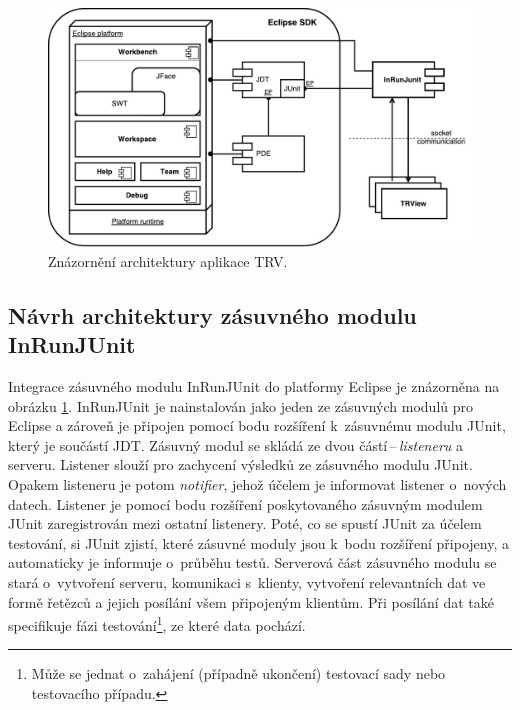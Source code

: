   \begin{figure}
    \includegraphics[width=\textwidth, center]{obrazky-figures/TRV_architecture.pdf}
    \caption{Znázornění architektury aplikace TRV.}
    \label{fig:TRV_architecture}
  \end{figure}

    \subsection{Návrh architektury zásuvného modulu InRunJUnit}
    Integrace zásuvného modulu InRunJUnit do platformy Eclipse je znázorněna na obrázku \ref{fig:TRV_architecture}. InRunJUnit je nainstalován jako jeden ze zásuvných modulů pro Eclipse a zároveň je připojen pomocí bodu rozšíření k~zásuvnému modulu JUnit, který je součástí JDT. Zásuvný modul se skládá ze dvou částí\,--\,\emph{listeneru} a serveru. Listener slouží pro zachycení výsledků ze zásuvného modulu JUnit. Opakem listeneru je potom \emph{notifier}, jehož účelem je informovat listener o~nových datech. Listener je pomocí bodu rozšíření poskytovaného zásuvným modulem JUnit zaregistrován mezi ostatní listenery. Poté, co se spustí JUnit za účelem testování, si JUnit zjistí, které zásuvné moduly jsou k~bodu rozšíření připojeny, a automaticky je informuje o~průběhu testů. Serverová část zásuvného modulu se stará o~vytvoření serveru, komunikaci s~klienty, vytvoření relevantních dat ve formě řetězců a jejich posílání všem připojeným klientům. Při posílání dat také specifikuje fázi testování\footnote{Může se jednat o~zahájení (případně ukončení) testovací sady nebo testovacího případu.}, ze které data pochází.

